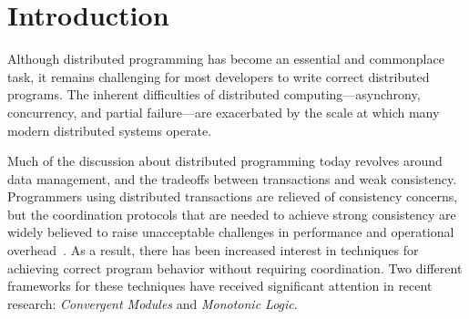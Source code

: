 \section{Introduction} 
\label{sec:intro}
Although distributed programming has become an essential and commonplace task,
it remains challenging for most developers to write correct distributed
programs. The inherent difficulties of distributed computing---asynchrony,
concurrency, and partial failure---are exacerbated by the scale at which many
modern distributed systems operate.


Much of the discussion about distributed programming today revolves around data
management, and the tradeoffs between transactions and weak
consistency. Programmers using distributed transactions are relieved of
consistency concerns, but the coordination protocols that are needed to achieve
strong consistency are widely believed to raise unacceptable challenges in
performance and operational overhead~\cite{Birman2009,Helland2009}. As a result,
there has been increased interest in techniques for achieving correct program
behavior without requiring coordination.  Two different frameworks for these
techniques have received significant attention in recent research:
\emph{Convergent Modules} and \emph{Monotonic Logic}.


